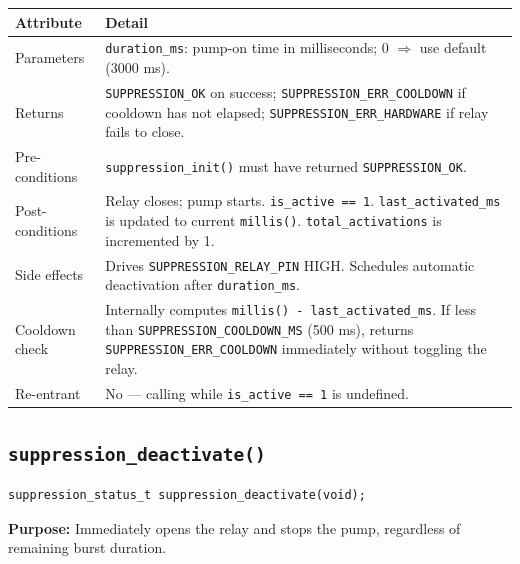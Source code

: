 \documentclass[12pt]{article}
\begin{document}
\begin{table}[H]
\centering\small
\begin{tabularx}{\textwidth}{L{3.5cm} X}
\toprule
\textbf{Attribute} & \textbf{Detail} \\
\midrule
Parameters & \texttt{duration\_ms}: pump-on time in milliseconds; 0 $\Rightarrow$ use default (3000 ms). \\
Returns & \texttt{SUPPRESSION\_OK} on success; \texttt{SUPPRESSION\_ERR\_COOLDOWN} if cooldown has not elapsed; \texttt{SUPPRESSION\_ERR\_HARDWARE} if relay fails to close. \\
Pre-conditions & \texttt{suppression\_init()} must have returned \texttt{SUPPRESSION\_OK}. \\
Post-conditions & Relay closes; pump starts. \texttt{is\_active == 1}. \texttt{last\_activated\_ms} is updated to current \texttt{millis()}. \texttt{total\_activations} is incremented by 1. \\
Side effects & Drives \texttt{SUPPRESSION\_RELAY\_PIN} HIGH. Schedules automatic deactivation after \texttt{duration\_ms}. \\
Cooldown check & Internally computes \texttt{millis() - last\_activated\_ms}. If less than \texttt{SUPPRESSION\_COOLDOWN\_MS} (500 ms), returns \texttt{SUPPRESSION\_ERR\_COOLDOWN} immediately without toggling the relay. \\
Re-entrant & No --- calling while \texttt{is\_active == 1} is undefined. \\
\bottomrule
\end{tabularx}
\end{table}

\subsection{\texttt{suppression\_deactivate()}}

\begin{lstlisting}[style=cstyle, numbers=none]
suppression_status_t suppression_deactivate(void);
\end{lstlisting}

\textbf{Purpose:} Immediately opens the relay and stops the pump, regardless of remaining burst duration.
\end{document}
